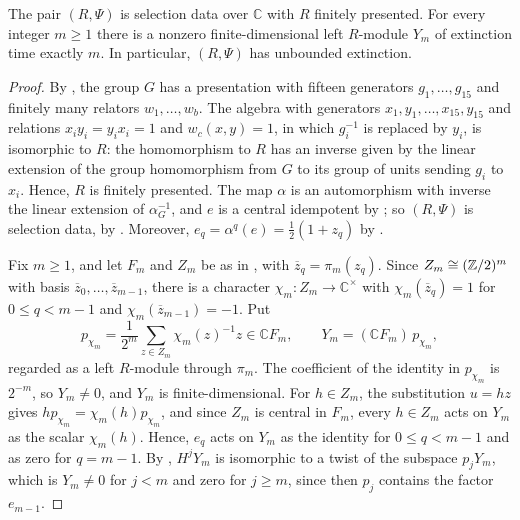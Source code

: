 \begin{theorem}
  \label{thm:selection-unbounded}
  The pair $(R,\Psi)$ is selection data over $\mathbb{C}$ with $R$ finitely
  presented. For every integer ${m\geq1}$ there is a nonzero finite-dimensional
  left $R$-module $Y_m$ of extinction time exactly $m$. In particular,
  $(R,\Psi)$ has unbounded extinction.
\end{theorem}

\begin{proof}
  By , the group $G$ has a presentation with
  fifteen generators $g_1,\dots,g_{15}$ and finitely many relators
  $w_1,\dots,w_b$. The algebra with generators $x_1,y_1,\dots,x_{15},y_{15}$
  and relations ${x_iy_i=y_ix_i=1}$ and ${w_c(x,y)=1}$, in which $g_i^{-1}$ is
  replaced by $y_i$, is isomorphic to $R$: the homomorphism to $R$ has
  an inverse given by the linear extension of the group homomorphism from $G$
  to its group of units sending $g_i$ to $x_i$. Hence, $R$ is finitely
  presented. The map $\alpha$ is an automorphism with inverse the linear
  extension of $\alpha_G^{-1}$, and $e$ is a central idempotent by
  ; so $(R,\Psi)$ is selection data, by
  . Moreover,
  ${e_q=\alpha^q(e)=\frac12(1+z_q)}$ by .

  Fix ${m\geq1}$, and let $F_m$ and $Z_m$ be as in
  , with ${\overline{z}_q=\pi_m(z_q)}$. Since
  ${Z_m\cong(\mathbb{Z}/2)^m}$ with basis $\overline{z}_0,\dots,\overline{z}_{m-1}$,
  there is a character ${\chi_m\colon Z_m\to\mathbb{C}^\times}$ with
  ${\chi_m(\overline{z}_q)=1}$ for ${0\leq q<m-1}$ and
  ${\chi_m(\overline{z}_{m-1})=-1}$.
  Put
  \[
    p_{\chi_m}=\frac{1}{2^m}\sum_{z\in Z_m}\chi_m(z)^{-1}z\in\mathbb{C}F_m,
    \qquad Y_m=(\mathbb{C}F_m)\,p_{\chi_m},
  \]
  regarded as a left $R$-module through $\pi_m$. The coefficient of the
  identity in $p_{\chi_m}$ is $2^{-m}$, so ${Y_m\neq0}$, and $Y_m$ is
  finite-dimensional. For ${h\in Z_m}$, the substitution ${u=hz}$ gives
  ${hp_{\chi_m}=\chi_m(h)p_{\chi_m}}$, and since $Z_m$ is central in $F_m$,
  every ${h\in Z_m}$ acts on $Y_m$ as the scalar $\chi_m(h)$. Hence, $e_q$ acts on
  $Y_m$ as the identity for ${0\leq q<m-1}$ and as zero for ${q=m-1}$. By
  , $H^jY_m$ is isomorphic to a twist of the
  subspace $p_jY_m$, which is
  ${Y_m\neq0}$ for ${j<m}$ and zero for ${j\geq m}$, since then $p_j$ contains the
  factor $e_{m-1}$.
\end{proof}

